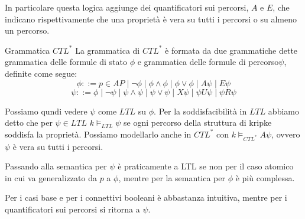 In particolare questa logica aggiunge dei quantificatori sui percorsi, \(A\) e \(E\), che indicano rispettivamente che una proprietà è vera su tutti i percorsi o su almeno un percorso.

\begin{definition}{Grammatica \(CTL^*\)}
  La grammatica di \(CTL^*\) è formata da due grammatiche dette grammatica delle formule di stato \(\phi\) e grammatica delle formule di percorso\(\psi\), definite come segue:
  \[\phi ::= p \in AP \mid \neg \phi \mid \phi \land \phi \mid \phi \lor \phi \mid A\psi \mid E\psi\]
  \[\psi ::= \phi \mid \neg \psi \mid \psi \land \psi \mid \psi \lor \psi \mid X\psi \mid \psi U\psi \mid \psi R\psi\]

\end{definition}
Possiamo qundi vedere \(\psi\) come \(LTL\) su \(\phi\). Per la soddisfacibilità in \(LTL\) abbiamo detto che per \(\psi \in LTL\) \(k \models_{LTL} \psi\) se ogni percorso della struttura di kripke soddisfa la proprietà. Possiamo modellarlo anche in \(CTL^*\) con \(k \models_{CTL^*} A\psi\), ovvero \(\psi\) è vera su tutti i percorsi.

Passando alla semantica per \(\psi\) è praticamente a LTL se non per il caso atomico in cui va generalizzato da \(p\) a \(\phi\), mentre per la semantica per \(\phi\) è più complessa.

Per i casi base e per i connettivi booleani è abbastanza intuitiva, mentre per i quantificatori sui percorsi si ritorna a \(\psi\).

